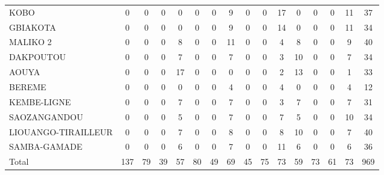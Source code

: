 {\begin{tabular}{l*{15}{c}}
KOBO        &              0&              0&              0&              0&              0&              0&              9&              0&              0&             17&              0&              0&              0&             11&             37\\
GBIAKOTA    &              0&              0&              0&              0&              0&              0&              9&              0&              0&             14&              0&              0&              0&             11&             34\\
MALIKO 2    &              0&              0&              0&              8&              0&              0&             11&              0&              0&              4&              8&              0&              0&              9&             40\\
DAKPOUTOU   &              0&              0&              0&              7&              0&              0&              7&              0&              0&              3&             10&              0&              0&              7&             34\\
AOUYA       &              0&              0&              0&             17&              0&              0&              0&              0&              0&              2&             13&              0&              0&              1&             33\\
BEREME      &              0&              0&              0&              0&              0&              0&              4&              0&              0&              4&              0&              0&              0&              4&             12\\
KEMBE-LIGNE &              0&              0&              0&              7&              0&              0&              7&              0&              0&              3&              7&              0&              0&              7&             31\\
SAOZANGANDOU&              0&              0&              0&              5&              0&              0&              7&              0&              0&              7&              5&              0&              0&             10&             34\\
LIOUANGO-TIRAILLEUR&              0&              0&              0&              7&              0&              0&              8&              0&              0&              8&             10&              0&              0&              7&             40\\
SAMBA-GAMADE&              0&              0&              0&              6&              0&              0&              7&              0&              0&             11&              6&              0&              0&              6&             36\\
Total       &            137&             79&             39&             57&             80&             49&             69&             45&             75&             73&             59&             73&             61&             73&            969\\
\hline\hline
\end{tabular}
}

